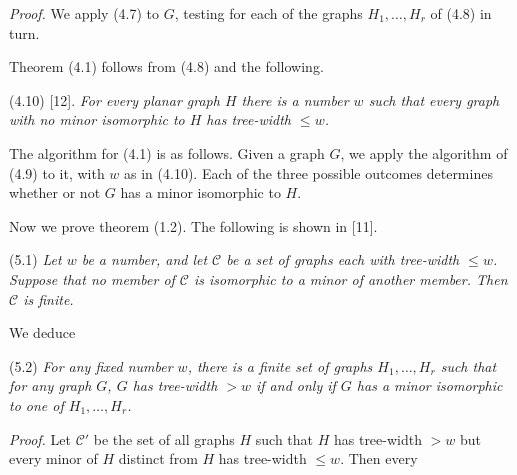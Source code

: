 \textit{Proof.} We apply (4.7) to $G$, testing for each of the graphs $H_1, \dots, H_r$ of (4.8) in turn.

Theorem (4.1) follows from (4.8) and the following.

\stmt
(4.10) [12]. \textit{For every planar graph $H$ there is a number $w$ such that every graph with no minor isomorphic to $H$ has tree-width $\le w$.}

The algorithm for (4.1) is as follows. Given a graph $G$, we apply the algorithm of (4.9) to it, with $w$ as in (4.10). Each of the three possible outcomes determines whether or not $G$ has a minor isomorphic to $H$.


Now we prove theorem (1.2). The following is shown in [11].

\stmt
(5.1) \textit{Let $w$ be a number, and let $\mathscr{C}$ be a set of graphs each with tree-width $\le w$. Suppose that no member of $\mathscr{C}$ is isomorphic to a minor of another member. Then $\mathscr{C}$ is finite.}

We deduce

\stmt
(5.2) \textit{For any fixed number $w$, there is a finite set of graphs $H_1, \dots, H_r$ such that for any graph $G$, $G$ has tree-width $> w$ if and only if $G$ has a minor isomorphic to one of $H_1, \dots, H_r$.}

\textit{Proof.} Let $\mathscr{C}'$ be the set of all graphs $H$ such that $H$ has tree-width $> w$ but every minor of $H$ distinct from $H$ has tree-width $\le w$. Then every
